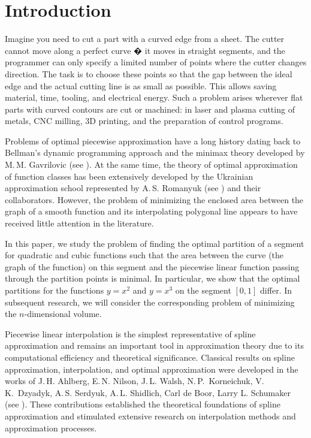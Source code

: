 \documentclass[amstex,16pt, amssymb]{article}
\theoremstyle{plain}
\theoremstyle{definition}
\numberwithin{equation}{section}
\numberwithin{equation}{section}
\begin{document}
\section{Introduction}
Imagine you need to cut a part with a curved edge from a sheet. The cutter cannot move along a perfect curve � it moves in straight segments, and the programmer can only specify a limited number of points where the cutter changes direction. The task is to choose these points so that the gap between the ideal edge and the actual cutting line is as small as possible. This allows saving material, time, tooling, and electrical energy. Such a problem arises wherever flat parts with curved contours are cut or machined: in laser and plasma cutting of metals, CNC milling, 3D printing, and the preparation of control programs.

Problems of optimal piecewise approximation have a long history dating back to Bellman's dynamic programming approach and the minimax theory de\-ve\-lo\-ped by M.\,M. Gavrilovic (see \cite{Gavrilovic}). At the same time, the theory of opti\-mal appro\-ximation of function classes has been extensively developed by the Ukrainian approximation school represented by A.\,S. Romanyuk (see \cite{Romanyuk}) and their collaborators. However, the problem of minimizing the enclosed area between the graph of a smooth function and its interpolating polygonal line appears to have received little attention in the literature.


In this paper, we study the problem of finding the optimal partition of a segment for quadratic and cubic functions such that the area between the curve (the graph of the function) on this segment and the piecewise linear function passing through the partition points is minimal. In particular, we show that the optimal partitions for the functions $y = x^{2}$ and $y = x^{3}$ on the segment $[0,1]$ differ. In subsequent research, we will consider the corresponding problem of minimizing the $n$-dimensional volume.

Piecewise linear interpolation is the simplest representative of spline appro\-ximation and remains an important tool in approximation theory due to its computational efficiency and theoretical significance. Classical results on spline approximation, interpolation, and optimal approximation were developed in the works of J.\,H. Ahlberg, E.\,N. Nilson, J.\,L. Walsh, N.\,P.~Korneichuk, V.\,K.~Dzya\-dyk, A.\,S. Serdyuk, A.\,L. Shidlich, Carl de Boor, Larry L. Schumaker (see \cite{Ahlberg,Kornei,Dzyad,Serdyuk,Boor,Larry}). These contributions established the theoretical foundations of spline approximation and stimulated extensive research on interpolation methods and approximation processes.
\end{document}
